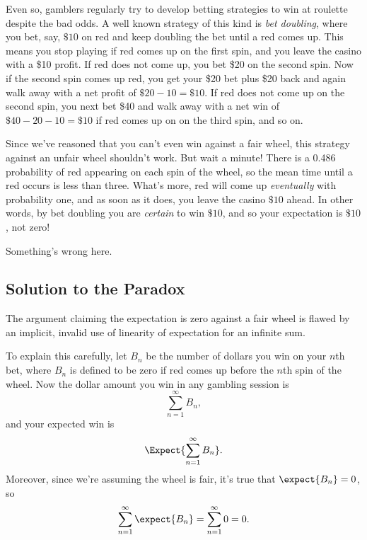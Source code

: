 Even so, gamblers regularly try to develop betting strategies to win
at roulette despite the bad odds.  A well known strategy of this kind
is \emph{bet doubling}, where you bet, say, $\$10$ on red and keep
doubling the bet until a red comes up.  This means you stop playing if
red comes up on the first spin, and you leave the casino with a \$10
profit.  If red does not come up, you bet \$20 on the second spin.
Now if the second spin comes up red, you get your \$20 bet plus \$20
back and again walk away with a net profit of $\$20-10 = \$10$.  If
red does not come up on the second spin, you next bet \$40 and walk
away with a net win of $\$40 -20-10 = \$10$ if red comes up on on the
third spin, and so on.

Since we've reasoned that you can't even win against a fair wheel,
this strategy against an unfair wheel shouldn't work.  But wait a
minute!  There is a 0.486 probability of red appearing on each spin of
the wheel, so the mean time until a red occurs is less than three.
What's more, red will come up \emph{eventually} with probability one,
and as soon as it does, you leave the casino $\$10$ ahead.  In other
words, by bet doubling you are \emph{certain} to win $\$10$, and so
your expectation is $\$10$, not zero!

Something's wrong here.

\subsection{Solution to the Paradox}\label{infinitebankroll}

The argument claiming the expectation is zero against a fair wheel is
flawed by an implicit, invalid use of linearity of expectation for an
infinite sum.

To explain this carefully, let $B_n$ be the number of dollars you win
on your $n$th bet, where $B_n$ is defined to be zero if red comes up
before the $n$th spin of the wheel.  Now the dollar amount you win in
any gambling session is
\[
\sum_{n = 1}^\infty B_n,
\]
and your expected win is
\begin{equation}\label{sumBn}
\Expect{\sum_{n = 1}^\infty B_n}.
\end{equation}
Moreover, since we're assuming the wheel is fair, it's true that
$\expect{B_n} = 0$, so
\begin{equation}\label{sumEBn0}
\sum_{n = 1}^\infty \expect{B_n} = \sum_{n = 1}^\infty 0 = 0.
\end{equation}

